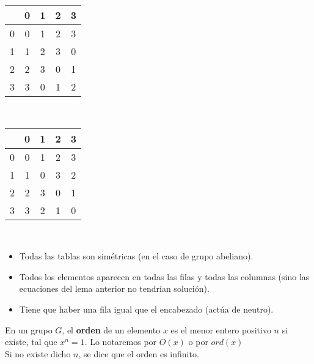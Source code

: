 \begin{ejemplo}
\begin{itemize}
        \begin{tabular}{c|c|c|c|c|}
             & 0 & 1 & 2 & 3\\
            \hline
            0 & 0 & 1 & 2 & 3\\
            \hline
            1 & 1 & 2 & 3 & 0\\
            \hline
            2 & 2 & 3 & 0 & 1\\
            \hline
            3 & 3 & 0 & 1 & 2\\
            \hline
        \end{tabular}

        \ \\

        \begin{tabular}{c|c|c|c|c|}
            & 0 & 1 & 2 & 3\\
           \hline
           0 & 0 & 1 & 2 & 3\\
           \hline
           1 & 1 & 0 & 3 & 2\\
           \hline
           2 & 2 & 3 & 0 & 1\\
           \hline
           3 & 3 & 2 & 1 & 0\\
           \hline
       \end{tabular}
    \end{itemize}
\end{ejemplo}

\begin{propiedades}\
    \begin{itemize}
        \item Todas las tablas son simétricas (en el caso de grupo abeliano).
        \item Todos los elementos aparecen en todas las filas y todas las columnas (sino las ecuaciones del lema anterior no tendrían solución).
        \item Tiene que haber una fila igual que el encabezado (actúa de neutro).
    \end{itemize}
\end{propiedades}

\begin{definicion}
    En un grupo $G$, el \textbf{orden} de un elemento $x$ es el menor entero positivo $n$ si existe, tal que $x^n=1$. Lo notaremos por $O(x)$ o por $ord(x)$\\

    Si no existe dicho $n$, se dice que el orden es infinito.
\end{definicion}

